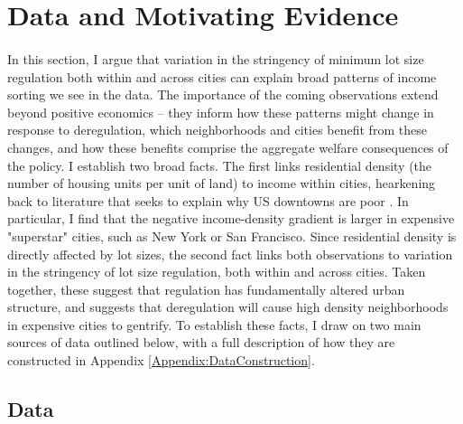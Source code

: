 \documentclass[11pt]{article}
\begin{document}
	\section{Data and Motivating Evidence}\label{Section:Evidence}

	\paragraph*{}
	In this section, I argue that variation in the stringency of minimum lot size regulation both within and across cities can explain broad patterns of income sorting we see in the data. The importance of the coming observations extend beyond positive economics -- they inform how these patterns might change in response to deregulation, which neighborhoods and cities benefit from these changes, and how these benefits comprise the aggregate welfare consequences of the policy. I establish two broad facts. The first links residential density (the number of housing units per unit of land) to income within cities, hearkening back to literature that seeks to explain why US downtowns are poor \citep{Gentrificationcycles, ccpoortransport, parispoor}. In particular, I find that the negative income-density gradient is larger in expensive "superstar" cities, such as New York or San Francisco. Since residential density is directly affected by lot sizes, the second fact links both observations to variation in the stringency of lot size regulation, both within and across cities. Taken together, these suggest that regulation has fundamentally altered urban structure, and suggests that deregulation will cause high density neighborhoods in expensive cities to gentrify. To establish these facts, I draw on two main sources of data outlined below, with a full description of how they are constructed in Appendix \ref{Appendix:DataConstruction}.
	
	\subsection{Data}
\end{document}
